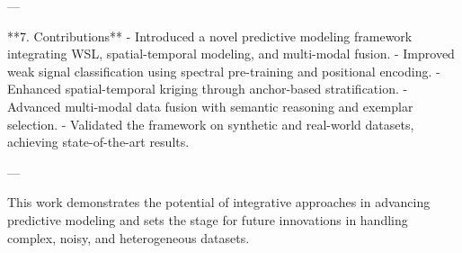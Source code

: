 ---

**7. Contributions**  
- Introduced a novel predictive modeling framework integrating WSL, spatial-temporal modeling, and multi-modal fusion.  
- Improved weak signal classification using spectral pre-training and positional encoding.  
- Enhanced spatial-temporal kriging through anchor-based stratification.  
- Advanced multi-modal data fusion with semantic reasoning and exemplar selection.  
- Validated the framework on synthetic and real-world datasets, achieving state-of-the-art results.  

--- 

This work demonstrates the potential of integrative approaches in advancing predictive modeling and sets the stage for future innovations in handling complex, noisy, and heterogeneous datasets.